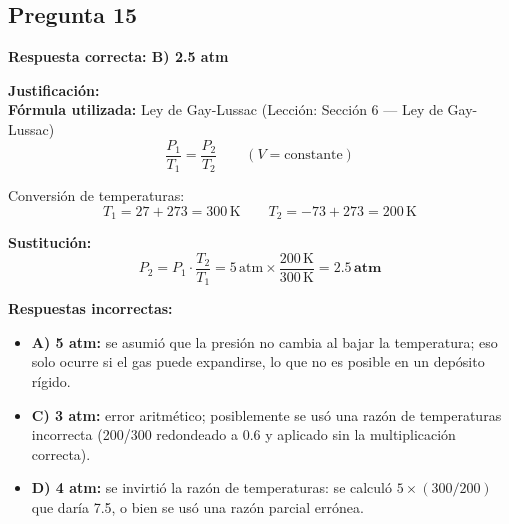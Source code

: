 \begin{respuestabox}
\subsection{Pregunta 15}
\textcolor{verdecorrecto}{\textbf{Respuesta correcta: B) 2.5 atm}}

\textbf{Justificación:}\\
\textbf{Fórmula utilizada:} Ley de Gay-Lussac (Lección: Sección 6 --- Ley de Gay-Lussac)
$$\frac{P_1}{T_1} = \frac{P_2}{T_2} \qquad (V = \text{constante})$$

Conversión de temperaturas:
$$T_1 = 27 + 273 = 300\,\text{K} \qquad T_2 = -73 + 273 = 200\,\text{K}$$

\textbf{Sustitución:}
$$P_2 = P_1 \cdot \frac{T_2}{T_1} = 5\,\text{atm} \times \frac{200\,\text{K}}{300\,\text{K}} = \mathbf{2.5\,\text{atm}}$$

\textbf{Respuestas incorrectas:}
\begin{itemize}
    \item \textbf{A) 5 atm:} se asumió que la presión no cambia al bajar la temperatura; eso solo ocurre si el gas puede expandirse, lo que no es posible en un depósito rígido.
    \item \textbf{C) 3 atm:} error aritmético; posiblemente se usó una razón de temperaturas incorrecta (200/300 redondeado a 0.6 y aplicado sin la multiplicación correcta).
    \item \textbf{D) 4 atm:} se invirtió la razón de temperaturas: se calculó $5 \times (300/200)$ que daría 7.5, o bien se usó una razón parcial errónea.
\end{itemize}
\end{respuestabox}